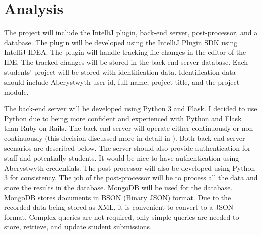 \section{Analysis}
\label{sec:analysis}
The project will include the IntelliJ plugin, back-end server, post-processor, and a database. The plugin will be developed using the IntelliJ Plugin SDK using IntelliJ IDEA. The plugin will handle tracking file changes in the editor of the IDE. The tracked changes will be stored in the back-end server database. Each students' project will be stored with identification data. Identification data should include Aberystwyth user id, full name, project title, and the project module.

The back-end server will be developed using Python 3 and Flask. I decided to use Python due to being more confident and experienced with Python and Flask than Ruby on Rails. The back-end server will operate either continuously or non-continuously (this decision discussed more in detail in ). Both back-end server scenarios are described below. The server should also provide authentication for staff and potentially students. It would be nice to have authentication using Aberystwyth credentials. The post-processor will also be developed using Python 3 for consistency. The job of the post-processor will be to process all the data and store the results in the database. MongoDB will be used for the database. MongoDB stores documents in BSON (Binary JSON) format. Due to the recorded data being stored as XML, it is convenient to convert to a JSON format. Complex queries are not required, only simple queries are needed to store, retrieve, and update student submissions.

